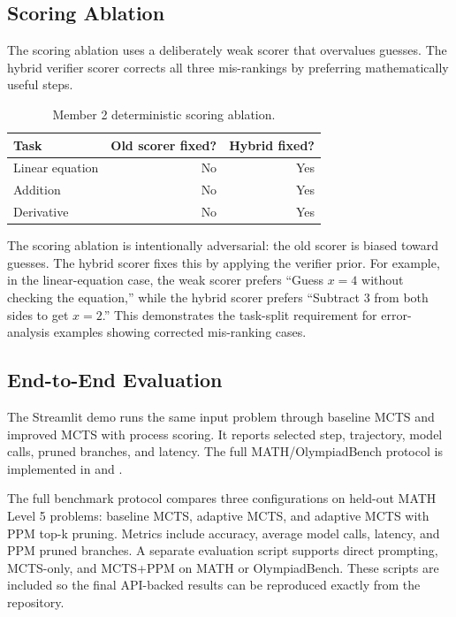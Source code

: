 \documentclass[sigconf,nonacm]{acmart}
\begin{document}
\subsection{Scoring Ablation}

The scoring ablation uses a deliberately weak scorer that overvalues guesses.
The hybrid verifier scorer corrects all three mis-rankings by preferring
mathematically useful steps.

\begin{table}[h]
\centering
\caption{Member 2 deterministic scoring ablation.}
\begin{tabular}{lrr}
\toprule
Task & Old scorer fixed? & Hybrid fixed? \\
\midrule
Linear equation & No & Yes \\
Addition & No & Yes \\
Derivative & No & Yes \\
\bottomrule
\end{tabular}
\end{table}

The scoring ablation is intentionally adversarial: the old scorer is biased
toward guesses. The hybrid scorer fixes this by applying the verifier prior.
For example, in the linear-equation case, the weak scorer prefers ``Guess
\(x=4\) without checking the equation,'' while the hybrid scorer prefers
``Subtract 3 from both sides to get \(x=2\).'' This demonstrates the task-split
requirement for error-analysis examples showing corrected mis-ranking cases.

\subsection{End-to-End Evaluation}

The Streamlit demo runs the same input problem through baseline MCTS and
improved MCTS with process scoring. It reports selected step, trajectory, model
calls, pruned branches, and latency. The full MATH/OlympiadBench protocol is
implemented in  and .

The full benchmark protocol compares three configurations on held-out MATH
Level 5 problems: baseline MCTS, adaptive MCTS, and adaptive MCTS with PPM
top-k pruning. Metrics include accuracy, average model calls, latency, and PPM
pruned branches. A separate evaluation script supports direct prompting,
MCTS-only, and MCTS+PPM on MATH or OlympiadBench. These scripts are included so
the final API-backed results can be reproduced exactly from the repository.
\end{document}
